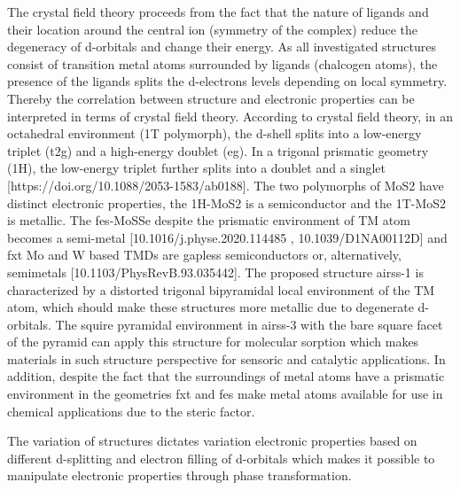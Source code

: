 \documentclass[a4paperm]{article}
\begin{document}
The crystal field theory proceeds from the fact that the nature of ligands and their location around the central ion (symmetry of the complex) reduce the degeneracy of d-orbitals and change their energy. As all investigated structures consist of transition metal atoms surrounded by ligands (chalcogen atoms), the presence of the ligands splits the d-electrons levels depending on local symmetry. Thereby the correlation between structure and electronic properties can be interpreted in terms of crystal field theory. According to crystal field theory, in an octahedral environment (1T polymorph), the d-shell splits into a low-energy triplet (t2g) and a high-energy doublet (eg). In a trigonal prismatic geometry (1H), the low-energy triplet further splits into a doublet and a singlet [https://doi.org/10.1088/2053-1583/ab0188]. The two polymorphs of MoS2 have distinct electronic properties, the 1H-MoS2 is a semiconductor and the 1T-MoS2 is metallic. The fes-MoSSe despite the prismatic environment of TM atom becomes a semi-metal [10.1016/j.physe.2020.114485 , 10.1039/D1NA00112D] and fxt Mo and W based TMDs are gapless semiconductors or, alternatively, semimetals [10.1103/PhysRevB.93.035442]. The proposed structure airss-1 is characterized by a distorted trigonal bipyramidal local environment of the TM atom, which should make these structures more metallic due to degenerate d-orbitals. The squire pyramidal environment in airss-3 with the bare square facet of the pyramid can apply this structure for molecular sorption which makes materials in such structure perspective for sensoric and catalytic applications. In addition, despite the fact that the surroundings of metal atoms have a prismatic environment in the geometries fxt and fes make metal atoms available for use in chemical applications due to the steric factor.

The variation of structures dictates variation electronic properties based on different d-splitting and electron filling of d-orbitals which makes it possible to manipulate electronic properties through phase transformation.




\end{document}
